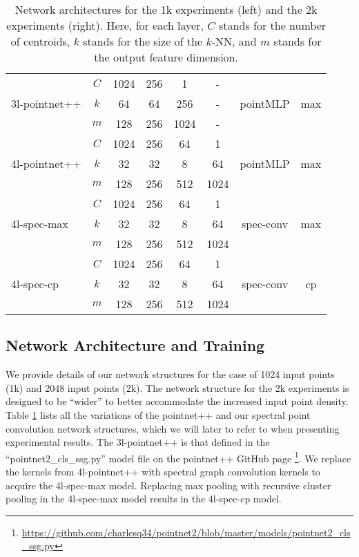 \documentclass[runningheads]{llncs}
\begin{document}
\begin{table}[!ht]
{{\begin{tabular}{l c | c c c c |c|c}
				\multirow{3}{*}{3l-pointnet++} & $C$ & 1024 &  256 & 1 & - &  & \multirow{3}{*}{max} \\
				&  $k$ &  64   & 64  & 256  & -& pointMLP \\
				&  $m$ & 128   & 256  & 1024  & - &    \\
				\hline			
				\multirow{3}{*}{4l-pointnet++} & $C$ &  1024 & 256 & 64 & 1 & & \multirow{3}{*}{max} \\
				&  $k$ & 32   & 32  & 8  & 64 & pointMLP   \\
				&  $m$ & 128   & 256  & 512  & 1024 &    \\
				\hline	
				\hline	
				\multirow{3}{*}{4l-spec-max} & $C$ &  1024 & 256 & 64 & 1 & & \multirow{3}{*}{max} \\
				&  $k$ & 32   & 32  & 8  & 64 & spec-conv  \\
				&  $m$ & 128   & 256  & 512  & 1024 &    \\
				\hline	
				\multirow{3}{*}{4l-spec-cp} & $C$ &  1024 & 256 & 64 & 1 & &\multirow{3}{*}{cp} \\
				&  $k$ & 32   & 32  & 8  & 64 & spec-conv \\
				&  $m$ & 128   & 256  & 512  & 1024 &    \\
				\hline	
				
			\end{tabular}
		}
	}
	\vspace{0.4cm}
	\caption{Network architectures for the 1k experiments (left) and the 2k experiments (right). Here, for each layer, $C$ stands for the number of centroids, $k$ stands for the size of the $k$-NN, and $m$ stands for the output feature dimension.}
	\vspace{-1.0cm} 
	\label{tab:Architecture}
\end{table}


\subsection{Network Architecture and Training}\label{sec:net_arch}
We provide details of our network structures for the case of 1024 input points (1k) and 2048 input points (2k). The network structure for the 2k experiments is designed to be ``wider'' to better accommodate the increased input point density. Table \ref{tab:Architecture} lists all the variations of the pointnet++ and our spectral point convolution network structures, which we will later to refer to when presenting experimental results. The 3l-pointnet++ is that defined in the ``pointnet2\_cls\_ssg.py'' model file on the pointnet++ GitHub page \footnote{\small \url{https://github.com/charlesq34/pointnet2/blob/master/models/pointnet2_cls_ssg.py}}. We replace the kernels from 4l-pointnet++ with spectral graph convolution kernels to acquire the 4l-spec-max model. Replacing max pooling with recursive cluster pooling in the 4l-spec-max model results in the 4l-spec-cp model. 
\end{document}
